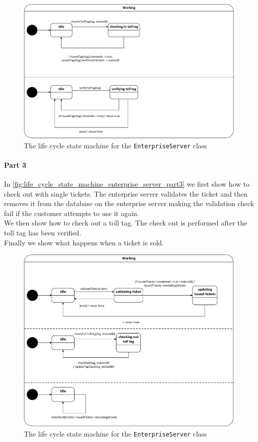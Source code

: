 \begin{figure}[H]
\centering
\includegraphics[width=0.7\linewidth]{img/behaviour_state_machines/life_cycle_state_machines/life_cycle_state_machine_enterprise_server_part2}
\caption{The life cycle state machine for the \texttt{EnterpriseServer} class}
\label{fig:life_cycle_state_machine_enterprise_server_part2}
\end{figure}

\paragraph*{Part 3} In \autoref{fig:life_cycle_state_machine_enterprise_server_part3} we first show how to check out with single tickets. The enterprise server validates the ticket and then removes it from the database on the enterprise server making the validation check fail if the customer attempts to use it again.
\\
We then show how to check out a toll tag. The check out is performed after the toll tag has been verified.
\\
Finally we show what happens when a ticket is sold.

\begin{figure}[H]
\centering
\includegraphics[width=0.7\linewidth]{img/behaviour_state_machines/life_cycle_state_machines/life_cycle_state_machine_enterprise_server_part3}
\caption{The life cycle state machine for the \texttt{EnterpriseServer} class}
\label{fig:life_cycle_state_machine_enterprise_server_part3}
\end{figure}